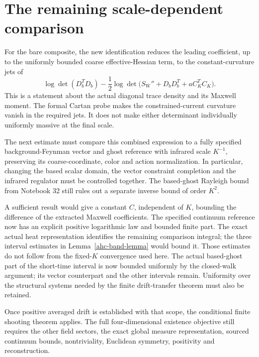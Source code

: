 \section{The remaining scale-dependent comparison}
\label{ctn-next}

For the bare composite, the new identification reduces
the leading coefficient, up to the uniformly bounded
coarse effective-Hessian term, to the constant-curvature
jets of
\[
 \log\det(D_b^TD_b)
 -\frac12\log\det
       \bigl(S_{\mathrm W}''+D_bD_b^T+aC_K^TC_K\bigr).
\]
This is a statement about the actual diagonal trace density
and its Maxwell moment. The formal Cartan probe makes
the constrained-current curvature vanish in the required
jets. It does not make either determinant individually
uniformly massive at the final scale.

The next estimate must compare this combined expression
to a fully specified background-Feynman vector and ghost
reference with infrared scale \(K^{-1}\), preserving its
coarse-coordinate, color and action normalization. In
particular, changing the based scalar domain, the vector
constraint completion and the infrared regulator must
be controlled together. The based-ghost Rayleigh bound
from Notebook 32 still rules out a separate inverse
bound of order \(K^2\).

A sufficient result would give a constant \(C\), independent
of \(K\), bounding the difference of the extracted
Maxwell coefficients. The specified continuum reference
now has an explicit positive logarithmic law and bounded
finite part. The exact actual heat representation identifies
the remaining comparison integral; the three interval
estimates in Lemma~\ref{ahc-band-lemma} would bound it.
Those estimates do not follow from the fixed-\(K\)
convergence used here. The actual based-ghost part of
the short-time interval is now bounded uniformly by
the closed-walk argument; its vector counterpart and
the other intervals remain. Uniformity over
the structural systems needed by the finite drift-transfer
theorem must also be retained.

Once positive averaged drift is established with that
scope, the conditional finite shooting theorem applies.
The full four-dimensional existence objective still
requires the other field sectors, the exact global
measure representation, sourced continuum bounds,
nontriviality, Euclidean symmetry, positivity and
reconstruction.

